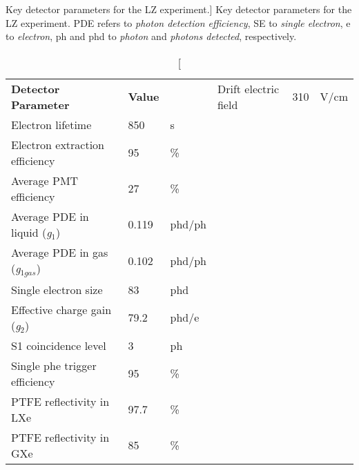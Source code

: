 \begin{table}[b!]
\centering
\caption
[Key detector parameters for the LZ experiment.]
{Key detector parameters for the LZ experiment. PDE refers to \textit{photon detection efficiency}, SE to \textit{single electron}, e to \textit{electron}, ph and phd to \textit{photon} and \textit{photons detected}, respectively.}
\label{tab:lz_parameters}
\vspace{1mm}
\renewcommand{\arraystretch}{1.2}
    \begin{tabularx}{0.7\linewidth}{@{\extracolsep{\fill}}lll}
    \toprule
    \textbf{Detector Parameter} & %
    \textbf{Value} & %
    \textbf{} & %
    \hline
    \hline

    Drift electric field                        & 310 & V/cm \\
    Electron lifetime                           & 850 & \micro{}s \\
    Electron extraction efficiency              & 95 & \% \\
    Average PMT efficiency                      & 27 & \% \\
    Average PDE in liquid (\textit{g$_{1}$})    & 0.119 & phd/ph \\
    Average PDE in gas (\textit{g$_{1gas}$})    & 0.102 & phd/ph \\
    Single electron size                        & 83 & phd \\
    Effective charge gain (\textit{g$_{2}$})    & 79.2 & phd/e \\
    S1 coincidence level                        & 3 & ph \\
    Single phe trigger efficiency               & 95 & \% \\
    PTFE reflectivity in LXe                    & 97.7 & \% \\
    PTFE reflectivity in GXe                    & 85 & \% \\ 
    
    \bottomrule
    \end{tabularx}
\end{table}
